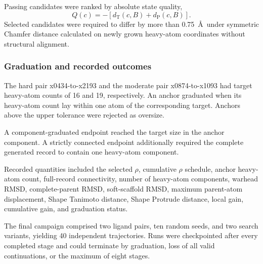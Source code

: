Passing candidates were ranked by absolute state quality,
\[
Q(c)
=
-\left[
d_{\mathrm{T}}(c,B)+d_{\mathrm{P}}(c,B)
\right].
\]
Selected candidates were required to differ by more than 0.75~\AA\ under
symmetric Chamfer distance calculated on newly grown heavy-atom
coordinates without structural alignment.

\subsubsection{Graduation and recorded outcomes}

The hard pair x0434-to-x2193 and the moderate pair x0874-to-x1093 had
target heavy-atom counts of 16 and 19, respectively. An anchor graduated
when its heavy-atom count lay within one atom of the corresponding
target. Anchors above the upper tolerance were rejected as oversize.

A component-graduated endpoint reached the target size in the anchor
component. A strictly connected endpoint additionally required the
complete generated record to contain one heavy-atom component.

Recorded quantities included the selected \(\rho\), cumulative \(\rho\)
schedule, anchor heavy-atom count, full-record connectivity, number of
heavy-atom components, warhead RMSD, complete-parent RMSD,
soft-scaffold RMSD, maximum parent-atom displacement, Shape Tanimoto
distance, Shape Protrude distance, local gain, cumulative gain, and
graduation status.

The final campaign comprised two ligand pairs, ten random seeds, and two
search variants, yielding 40 independent trajectories. Runs were
checkpointed after every completed stage and could terminate by
graduation, loss of all valid continuations, or the maximum of eight
stages.
